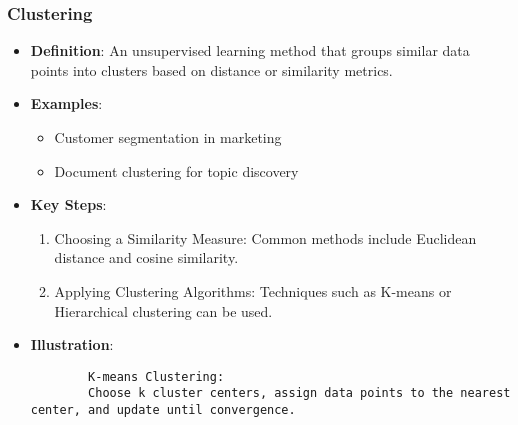 \documentclass[aspectratio=169]{beamer}
\begin{document}
\begin{frame}[fragile]
    \frametitle{Clustering}
    \begin{itemize}
        \item \textbf{Definition}: An unsupervised learning method that groups similar data points into clusters based on distance or similarity metrics.
        \item \textbf{Examples}:
            \begin{itemize}
                \item Customer segmentation in marketing
                \item Document clustering for topic discovery
            \end{itemize}
        \item \textbf{Key Steps}:
            \begin{enumerate}
                \item Choosing a Similarity Measure: Common methods include Euclidean distance and cosine similarity.
                \item Applying Clustering Algorithms: Techniques such as K-means or Hierarchical clustering can be used.
            \end{enumerate}
        \item \textbf{Illustration}:
        \begin{lstlisting}
        K-means Clustering:
        Choose k cluster centers, assign data points to the nearest center, and update until convergence.
        \end{lstlisting}
    \end{itemize}
\end{frame}
\end{document}

